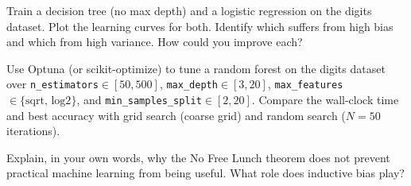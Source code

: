 \begin{exercise}
Train a decision tree (no max depth) and a logistic regression on the digits dataset. Plot the learning curves for both. Identify which suffers from high bias and which from high variance. How could you improve each?
\end{exercise}

\begin{exercise}
Use Optuna (or scikit-optimize) to tune a random forest on the digits dataset over \texttt{n\_estimators}$\in[50,500]$, \texttt{max\_depth}$\in[3,20]$, \texttt{max\_features}$\in\{\text{sqrt, log2}\}$, and \texttt{min\_samples\_split}$\in[2,20]$. Compare the wall-clock time and best accuracy with grid search (coarse grid) and random search ($N=50$ iterations).
\end{exercise}

\begin{exercise}
Explain, in your own words, why the No Free Lunch theorem does not prevent practical machine learning from being useful. What role does inductive bias play?
\end{exercise}
